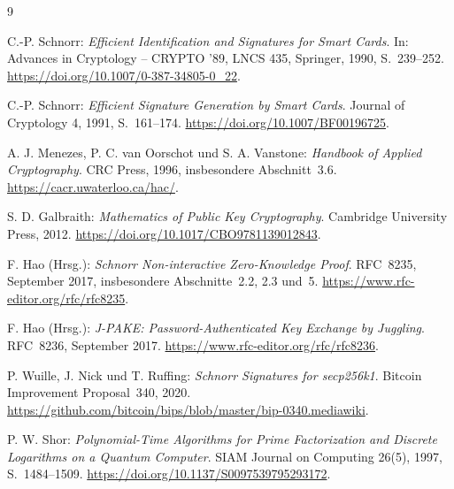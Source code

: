 
\renewcommand{\refname}{Literaturverzeichnis}

\begin{thebibliography}{9}

C.-P. Schnorr:
\emph{Efficient Identification and Signatures for Smart Cards}.
In: Advances in Cryptology -- CRYPTO '89,
LNCS 435, Springer, 1990, S.~239--252.
\url{https://doi.org/10.1007/0-387-34805-0_22}.

C.-P. Schnorr:
\emph{Efficient Signature Generation by Smart Cards}.
Journal of Cryptology 4, 1991, S.~161--174.
\url{https://doi.org/10.1007/BF00196725}.

A. J. Menezes, P. C. van Oorschot und S. A. Vanstone:
\emph{Handbook of Applied Cryptography}.
CRC Press, 1996, insbesondere Abschnitt~3.6.
\url{https://cacr.uwaterloo.ca/hac/}.

S. D. Galbraith:
\emph{Mathematics of Public Key Cryptography}.
Cambridge University Press, 2012.
\url{https://doi.org/10.1017/CBO9781139012843}.

F. Hao (Hrsg.):
\emph{Schnorr Non-interactive Zero-Knowledge Proof}.
RFC~8235, September 2017,
insbesondere Abschnitte~2.2, 2.3 und~5.
\url{https://www.rfc-editor.org/rfc/rfc8235}.

F. Hao (Hrsg.):
\emph{J-PAKE: Password-Authenticated Key Exchange by Juggling}.
RFC~8236, September 2017.
\url{https://www.rfc-editor.org/rfc/rfc8236}.

P. Wuille, J. Nick und T. Ruffing:
\emph{Schnorr Signatures for secp256k1}.
Bitcoin Improvement Proposal~340, 2020.
\url{https://github.com/bitcoin/bips/blob/master/bip-0340.mediawiki}.

P. W. Shor:
\emph{Polynomial-Time Algorithms for Prime Factorization
and Discrete Logarithms on a Quantum Computer}.
SIAM Journal on Computing 26(5), 1997,
S.~1484--1509.
\url{https://doi.org/10.1137/S0097539795293172}.

\end{thebibliography}
